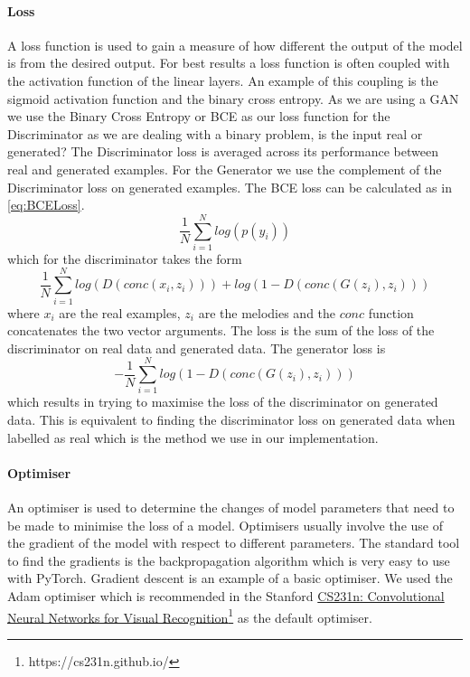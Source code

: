 \paragraph{Loss}
A loss function is used to gain a measure of how different the output of the model is from the desired output.
For best results a loss function is often coupled with the activation function of the linear layers.
An example of this coupling is the sigmoid activation function and the binary cross entropy. %
As we are using a GAN we use the Binary Cross Entropy or BCE as our loss function for the Discriminator as we are dealing with a binary problem, is the input real or generated?
The Discriminator loss is averaged across its performance between real and generated examples.
For the Generator we use the complement of the Discriminator loss on generated examples.
The BCE loss can be calculated as in \autoref{eq:BCELoss}.
\begin{equation}
    \label{eq:BCELoss}
    \frac{1}{N} \sum_{i=1}^N log(p(y_i))
\end{equation}
    which for the discriminator takes the form
\begin{equation}
    \frac{1}{N} \sum_{i=1}^N log(D(conc(x_i,z_i))) + log(1-D(conc(G(z_i),z_i)))
\end{equation}
    where $x_i$ are the real examples, $z_i$ are the melodies and the $conc$ function concatenates the two vector arguments.
    The loss is the sum of the loss of the discriminator on real data and generated data.
    The generator loss is
\begin{equation}
    -\frac{1}{N} \sum_{i=1}^N log(1-D(conc(G(z_i),z_i)))
\end{equation}
    which results in trying to maximise the loss of the discriminator on generated data.
    This is equivalent to finding the discriminator loss on generated data when labelled as real which is the method we use in our implementation.

    
\paragraph{Optimiser}
An optimiser is used to determine the changes of model parameters that need to be made to minimise the loss of a model.
Optimisers usually involve the use of the gradient of the model with respect to different parameters.
The standard tool to find the gradients is the backpropagation algorithm 
which is very easy to use with PyTorch.
Gradient descent is an example of a basic optimiser.
We used the Adam optimiser \cite{Adam} which is recommended in the Stanford \href{https://cs231n.github.io/}{CS231n: Convolutional Neural Networks for Visual Recognition}\footnote{https://cs231n.github.io/} as the default optimiser.





